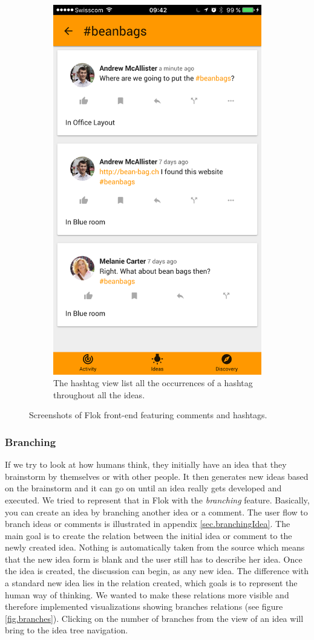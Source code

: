 \documentclass[a4paper,12pt,twoside]{article}
\begin{document}
\begin{figure}[!htb]
\begin{subfigure}[t]{.48\textwidth}
        \includegraphics[width=.67\textwidth]{images/hashtagView.png}
        \caption{The hashtag view list all the occurrences of a hashtag throughout all the ideas.}
        \label{fig.hashtagView}
    \end{subfigure}
    \caption{Screenshots of Flok front-end featuring comments and hashtags.}
\end{figure}

\subsubsection{Branching}
\label{sec.branching}
If we try to look at how humans think, they initially have an idea that they brainstorm by themselves or with other people.
It then generates new ideas based on the brainstorm and it can go on until an idea really gets developed and executed.
We tried to represent that in Flok with the \emph{branching} feature.
Basically, you can create an idea by branching another idea or a comment.
The user flow to branch ideas or comments is illustrated in appendix \ref{sec.branchingIdea}.
The main goal is to create the relation between the initial idea or comment to the newly created idea.
Nothing is automatically taken from the source which means that the new idea form is blank and the user still has to describe her idea.
Once the idea is created, the discussion can begin, as any new idea.
The difference with a standard new idea lies in the relation created, which goals is to represent the human way of thinking.
We wanted to make these relations more visible and therefore implemented visualizations showing branches relations (see figure \ref{fig.branches}).
Clicking on the number of branches from the view of an idea will bring to the idea tree navigation.
\end{document}
